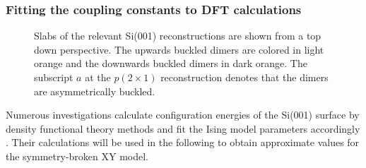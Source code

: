 	\subsubsection{Fitting the coupling constants to DFT calculations}
	\begin{figure}
		\centering
		
		\caption{Slabs of the relevant Si(001) reconstructions are shown from a top down perspective. The upwards buckled dimers are colored in light orange and the downwards buckled dimers in dark orange. The subscript $a$ at the $p(2 \times 1)$ reconstruction denotes that the dimers are asymmetrically buckled.}
		\label{Figure::surface-configurations}
	\end{figure}	
	Numerous investigations calculate configuration energies of the Si(001) surface \cite{fu2001molecular, ramstad1995theoretical} by density functional theory methods and fit the Ising model parameters accordingly \cite{pillay2004revisit, inoue1994order, ihm1983structural, xiao2019spontaneous}. Their calculations will be used in the following to obtain approximate values for the symmetry-broken XY model.  \\
	
